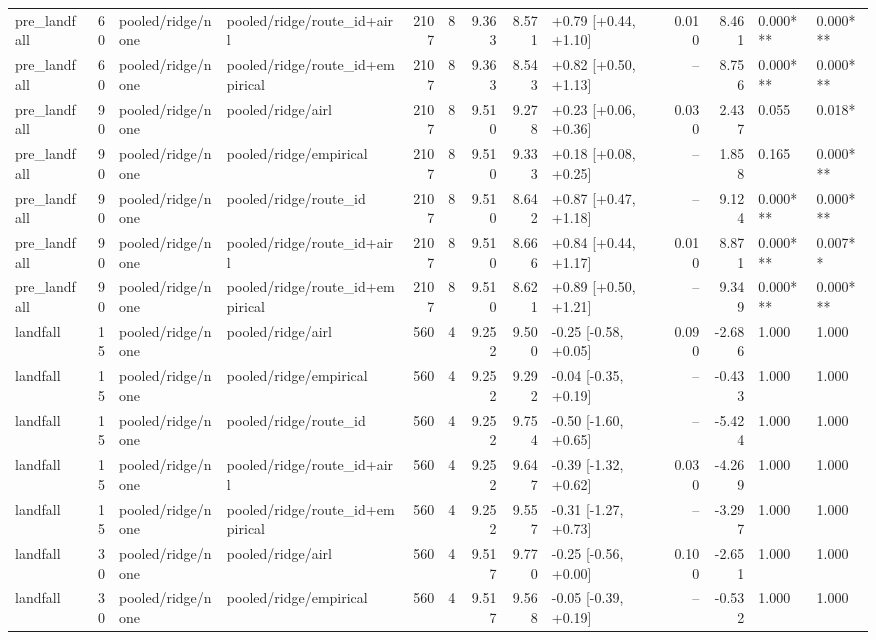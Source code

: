 \begin{tabular}{lrllrrrrlrrll}
pre_landfall & 60 & pooled/ridge/none & pooled/ridge/route_id+airl & 2107 & 8 & 9.363 & 8.571 & +0.79 [+0.44, +1.10] & 0.010 & 8.461 & 0.000*** & 0.000*** \\
pre_landfall & 60 & pooled/ridge/none & pooled/ridge/route_id+empirical & 2107 & 8 & 9.363 & 8.543 & +0.82 [+0.50, +1.13] & -- & 8.756 & 0.000*** & 0.000*** \\
pre_landfall & 90 & pooled/ridge/none & pooled/ridge/airl & 2107 & 8 & 9.510 & 9.278 & +0.23 [+0.06, +0.36] & 0.030 & 2.437 & 0.055 & 0.018* \\
pre_landfall & 90 & pooled/ridge/none & pooled/ridge/empirical & 2107 & 8 & 9.510 & 9.333 & +0.18 [+0.08, +0.25] & -- & 1.858 & 0.165 & 0.000*** \\
pre_landfall & 90 & pooled/ridge/none & pooled/ridge/route_id & 2107 & 8 & 9.510 & 8.642 & +0.87 [+0.47, +1.18] & -- & 9.124 & 0.000*** & 0.000*** \\
pre_landfall & 90 & pooled/ridge/none & pooled/ridge/route_id+airl & 2107 & 8 & 9.510 & 8.666 & +0.84 [+0.44, +1.17] & 0.010 & 8.871 & 0.000*** & 0.007** \\
pre_landfall & 90 & pooled/ridge/none & pooled/ridge/route_id+empirical & 2107 & 8 & 9.510 & 8.621 & +0.89 [+0.50, +1.21] & -- & 9.349 & 0.000*** & 0.000*** \\
landfall & 15 & pooled/ridge/none & pooled/ridge/airl & 560 & 4 & 9.252 & 9.500 & -0.25 [-0.58, +0.05] & 0.090 & -2.686 & 1.000 & 1.000 \\
landfall & 15 & pooled/ridge/none & pooled/ridge/empirical & 560 & 4 & 9.252 & 9.292 & -0.04 [-0.35, +0.19] & -- & -0.433 & 1.000 & 1.000 \\
landfall & 15 & pooled/ridge/none & pooled/ridge/route_id & 560 & 4 & 9.252 & 9.754 & -0.50 [-1.60, +0.65] & -- & -5.424 & 1.000 & 1.000 \\
landfall & 15 & pooled/ridge/none & pooled/ridge/route_id+airl & 560 & 4 & 9.252 & 9.647 & -0.39 [-1.32, +0.62] & 0.030 & -4.269 & 1.000 & 1.000 \\
landfall & 15 & pooled/ridge/none & pooled/ridge/route_id+empirical & 560 & 4 & 9.252 & 9.557 & -0.31 [-1.27, +0.73] & -- & -3.297 & 1.000 & 1.000 \\
landfall & 30 & pooled/ridge/none & pooled/ridge/airl & 560 & 4 & 9.517 & 9.770 & -0.25 [-0.56, +0.00] & 0.100 & -2.651 & 1.000 & 1.000 \\
landfall & 30 & pooled/ridge/none & pooled/ridge/empirical & 560 & 4 & 9.517 & 9.568 & -0.05 [-0.39, +0.19] & -- & -0.532 & 1.000 & 1.000 \\

\end{tabular}
